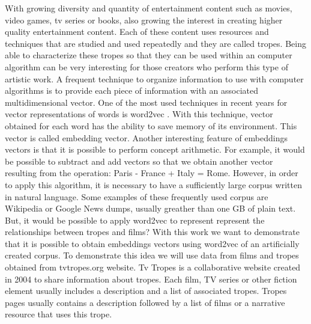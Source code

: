 \documentclass[letterpaper]{article}
\begin{document}
    With growing diversity and quantity of entertainment content such as movies, video games, tv series or books, also growing the interest in creating higher quality entertainment content.
    Each of these content uses resources and techniques that are studied and used repeatedly and they are called tropes. Being able to characterize these tropes so that they can be used within an computer algorithm can be very interesting for those creators who perform this type of artistic work. A frequent technique to organize information to use with computer algorithms is to provide each piece of information with an associated multidimensional vector. One of the most used techniques in recent years for vector representations of words is word2vec \cite{mikolov2013}.
    With this technique, vector obtained for each word has the ability to save memory of its environment. This vector is called embedding vector.
    Another interesting feature of embeddings vectors is that it is possible to perform concept arithmetic. For example, it would be possible to subtract and add vectors so that we obtain another vector resulting from the operation: Paris - France + Italy = Rome. However, in order to apply this algorithm, it is necessary to have a sufficiently large corpus written in natural language. Some examples of these frequently used corpus are Wikipedia or Google News dumps, usually greather than one GB of plain text. \\
    
    But, it would be possible to apply word2vec to represent represent the relationships between tropes and films? With this work we want to demonstrate that it is possible to obtain embeddings vectors using word2vec of an artificially created corpus. To demonstrate this idea we will use data from films and tropes obtained from tvtropes.org website. Tv Tropes is a collaborative website created in 2004 to share information about tropes. Each film, TV series or other
    fiction element usually includes a description and a list of associated
    tropes. Tropes pages usually contains a description followed by a list
    of films or a narrative resource that uses this trope.\\
    
	
\end{document}
